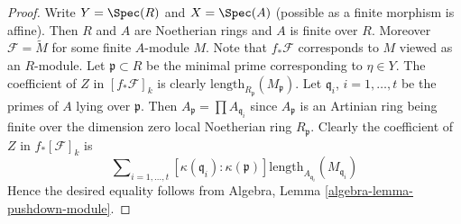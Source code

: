 \begin{proof}
\medskip\noindent
Write $Y = \Spec(R)$ and $X = \Spec(A)$ (possible as
a finite morphism is affine).
Then $R$ and $A$ are Noetherian rings and $A$ is finite over $R$.
Moreover $\mathcal{F} = \widetilde{M}$ for some finite $A$-module
$M$. Note that $f_*\mathcal{F}$ corresponds to $M$ viewed as an $R$-module.
Let $\mathfrak p \subset R$ be the minimal prime corresponding
to $\eta \in Y$. The coefficient of $Z$ in $[f_*\mathcal{F}]_k$
is clearly $\text{length}_{R_{\mathfrak p}}(M_{\mathfrak p})$.
Let $\mathfrak q_i$, $i = 1, \ldots, t$ be the primes of $A$
lying over $\mathfrak p$. Then $A_{\mathfrak p} = \prod A_{\mathfrak q_i}$
since $A_{\mathfrak p}$ is an Artinian ring being finite over the
dimension zero local Noetherian ring $R_{\mathfrak p}$.
Clearly the coefficient of $Z$ in $f_*[\mathcal{F}]_k$ is
$$
\sum\nolimits_{i = 1, \ldots, t}
[\kappa(\mathfrak q_i) : \kappa(\mathfrak p)]
\text{length}_{A_{\mathfrak q_i}}(M_{\mathfrak q_i})
$$
Hence the desired equality follows from
Algebra, Lemma \ref{algebra-lemma-pushdown-module}.
\end{proof}




















